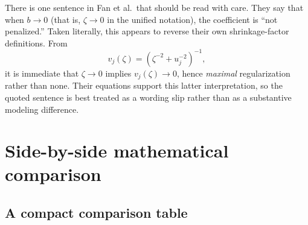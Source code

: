 \documentclass[11pt]{article}
\begin{document}
There is one sentence in Fan et al.\ that should be read with care. They say that when $b\to 0$ (that is, $\zeta\to 0$ in the unified notation), the coefficient is ``not penalized.'' Taken literally, this appears to reverse their own shrinkage-factor definitions. From
\[
v_j(\zeta)=\left(\zeta^{-2}+u_j^{-2}\right)^{-1},
\]
it is immediate that $\zeta \to 0$ implies $v_j(\zeta)\to 0$, hence \emph{maximal} regularization rather than none. Their equations support this latter interpretation, so the quoted sentence is best treated as a wording slip rather than as a substantive modeling difference.

\section{Side-by-side mathematical comparison}

\subsection{A compact comparison table}
\end{document}
